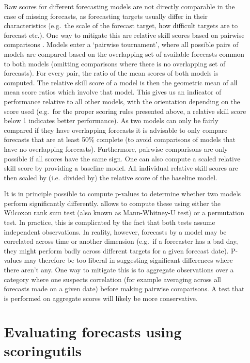 \documentclass[
]{jss}
\begin{document}
Raw scores for different forecasting models are not directly comparable
in the case of missing forecasts, as forecasting targets usually differ
in their characteristics (e.g.~the scale of the forecast target, how
difficult targets are to forecast etc.). One way to mitigate this are
relative skill scores based on pairwise comparisons
\citep{cramerEvaluationIndividualEnsemble2021}. Models enter a `pairwise
tournament', where all possible pairs of models are compared based on
the overlapping set of available forecasts common to both models
(omitting comparisons where there is no overlapping set of forecasts).
For every pair, the ratio of the mean scores of both models is computed.
The relative skill score of a model is then the geometric mean of all
mean score ratios which involve that model. This gives us an indicator
of performance relative to all other models, with the orientation
depending on the score used (e.g.~for the proper scoring rules presented
above, a relative skill score below 1 indicates better performance). As
two models can only be fairly compared if they have overlapping
forecasts it is advisable to only compare forecasts that are at least
50\% complete (to avoid comparisons of models that have no overlapping
forecasts). Furthermore, pairwise comparisons are only possible if all
scores have the same sign. One can also compute a scaled relative skill
score by providing a baseline model. All individual relative skill
scores are then scaled by (i.e.~divided by) the relative score of the
baseline model.

It is in principle possible to compute p-values to determine whether two
models perform significantly differently.  allows to
compute these using either the Wilcoxon rank sum test (also known as
Mann-Whitney-U test) \citep{mannTestWhetherOne1947} or a permutation
test. In practice, this is complicated by the fact that both tests
assume independent observations. In reality, however, forecasts by a
model may be correlated across time or another dimension (e.g.~if a
forecaster has a bad day, they might perform badly across different
targets for a given forecast date). P-values may therefore be too
liberal in suggesting significant differences where there aren't any.
One way to mitigate this is to aggregate observations over a category
where one suspects correlation (for example averaging across all
forecasts made on a given date) before making pairwise comparisons. A
test that is performed on aggregate scores will likely be more
conservative.

\hypertarget{evaluation-example}{%
\section{Evaluating forecasts using
scoringutils}\label{evaluation-example}}
\end{document}
